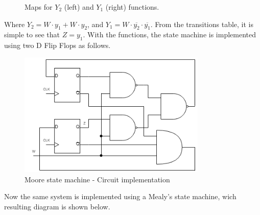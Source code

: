 \begin{figure}[H]
    \begin{center}
         \begin{Karnaughvuit}
         \end{Karnaughvuit}
         \begin{Karnaughvuit}
         \end{Karnaughvuit}
         \caption{Maps for $Y_2$ (left) and $Y_1$ (right) functions.}
    \end{center}
    \end{figure}
Where $Y_2 = W \cdot y_1 + W \cdot y_2$, and $Y_1 = W \cdot \overline{y_2} \cdot \overline{y_1}$. 
From the transitions table, it is simple to see that $Z = y_1$.
With the functions, the state machine is implemented 
using two D Flip Flops as follows. 

\begin{figure}[H]
    \begin{centering}
    \includegraphics[width=0.8\textwidth]{Graficos3/3a_Compuertas_Moore.png}
    \par\end{centering}
    \caption{Moore state machine - Circuit implementation}
\end{figure}

Now the same system is implemented using a Mealy's 
state machine, wich resulting diagram is shown below.

